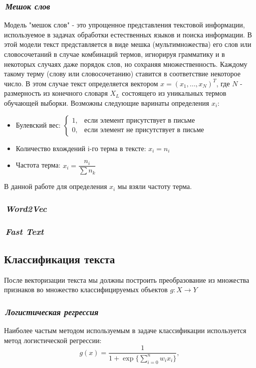 \documentclass[12pt]{article}
\begin{document}
\subsubsection*{\it\,Мешок слов}
Модель "мешок слов" - это упрощенное представления текстовой информации, используемое в задачах обработки естественных языков и поиска информации. В этой модели текст представляется в виде мешка (мультимножества) его слов или словосочетаний в случае комбинаций термов, игнорируя грамматику и в некоторых случаях даже порядок слов, но сохраняя множественность. Каждому такому терму (слову или словосочетанию) ставится в соответствие некоторое число. В этом случае текст определяется вектором $x=(x_1, ..., x_N)^T$, где $N$ - размерность из конечного словаря $X_L$ состоящего из уникальных термов обучающей выборки. Возможны следующие варинаты определения $x_i$:

\begin{itemize}
\item Булевский вес: $\begin{cases} 1, & \mbox{если элемент присутствует в письме} \\ 0, & \mbox{если элемент не присутствует в письме}  \end{cases}$
\item Количество вхождений i-го терма в тексте: $x_i = n_i$
\item Частота терма: $x_i = \dfrac{n_i}{\sum n_k}$
\end{itemize}

В данной работе для определения $x_i$ мы взяли частоту терма.

\subsubsection*{\it\,Word2Vec}

\subsubsection*{\it\,Fast Text}

\subsection*{Классификация текста}
После векторизации текста мы должны построить преобразование из множества признаков во множество классифицируемых объектов $g: X \rightarrow Y$

\subsubsection*{\it\,Логистическая регрессия}
Наиболее частым методом используемым в задаче классификации используется метод логистической регрессии:
$$
g(x) = \dfrac{1}{1 + \exp{ \{ \sum_{i=0}^n w_i x_i  \} }},
$$
\end{document}
